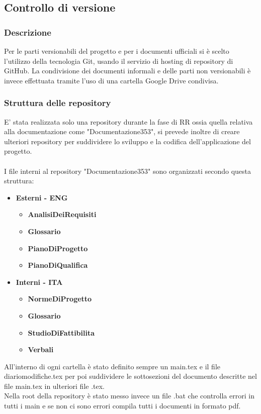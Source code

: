 \documentclass[NormeDiProgetto.tex]{subfiles}
\begin{document}
	\subsection{Controllo di versione}
	
	\subsubsection{Descrizione}
	Per le parti versionabili del progetto e per i documenti ufficiali si è scelto l'utilizzo della tecnologia Git, usando il servizio di hosting di repository di GitHub.
	La condivisione dei documenti informali e delle parti non versionabili è invece effettuata tramite l'uso di una cartella Google Drive condivisa.
	
	\subsubsection{Struttura delle repository}
	E' stata realizzata solo una repository durante la fase di RR ossia quella relativa alla documentazione come "Documentazione353", si prevede inoltre di creare ulteriori repository per suddividere lo sviluppo e la codifica dell'applicazione del progetto. \\\\
	I file interni al repository "Documentazione353" sono organizzati secondo questa struttura:
	\begin{itemize}
		\item \textbf{Esterni - ENG}
				\begin{itemize}
				\item \textbf{AnalisiDeiRequisiti}
				\item \textbf{Glossario}
				\item \textbf{PianoDiProgetto}
				\item \textbf{PianoDiQualifica}
			\end{itemize}
		\item \textbf{Interni - ITA}
				\begin{itemize}
					\item \textbf{NormeDiProgetto}
					\item \textbf{Glossario}
					\item \textbf{StudioDiFattibilita}
					\item \textbf{Verbali}
				\end{itemize}		
	\end{itemize}	
	All'interno di ogni cartella è stato definito sempre un main.tex e il file diariomodifiche.tex per poi suddividere le sottosezioni del documento descritte nel file main.tex in ulteriori file .tex.\\
	Nella root della repository è stato messo invece un file .bat che controlla errori in tutti i main e se non ci sono errori compila tutti i documenti in formato pdf.
	
\end{document}
